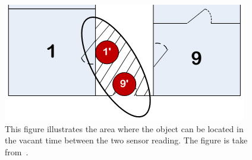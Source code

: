 \begin{figure}%
\centering
\includegraphics[width=0.8\columnwidth]{images/speed2.png}%
\caption{This figure illustrates the area where the object can be located in the vacant time between the two sensor reading. The figure is take from~\cite{Jensen:2009:GMB:1590953.1591000}.}%
\label{fig:speed2}%
\end{figure}





